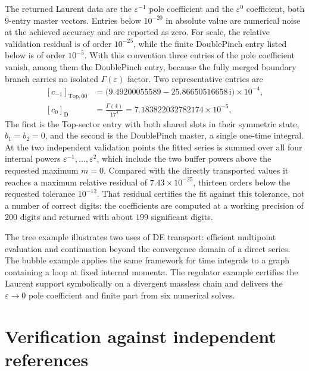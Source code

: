 \documentclass[11pt,a4paper]{article}
\numberwithin{table}{section}
\newcommand{\ii}{\mathrm i}
\begin{document}
The returned Laurent data are the $\varepsilon^{-1}$ pole coefficient and the
$\varepsilon^0$ coefficient, both $9$-entry master vectors. Entries below $10^{-20}$ in
absolute value are numerical noise at the achieved accuracy and are reported as zero. For scale,
the relative validation residual is of order $10^{-25}$, while the finite DoublePinch entry
listed below is of order $10^{-5}$. With this convention three entries of the pole coefficient vanish,
among them the DoublePinch entry, because the fully merged boundary branch carries no
isolated $\Gamma(\varepsilon)$ factor. Two representative entries are
\begin{equation}
  \begin{aligned}
  [c_{-1}]_{\mathrm{Top},00}&=\bigl(9.49200055589-25.86650516658\,\ii\bigr)\times10^{-4},\\
  [c_0]_{\mathrm{D}}&=\frac{\Gamma(4)}{17^4}=7.183822032782174\times10^{-5},
  \end{aligned}
  \label{eq:ep-finite-entries}
\end{equation}
The first is the Top-sector entry with both shared slots in their symmetric state, $b_1=b_2=0$,
and the second is the DoublePinch master, a single one-time integral. At the two independent
validation points the fitted series is summed over all four internal powers
$\varepsilon^{-1},\ldots,\varepsilon^{2}$, which include the two buffer powers above the requested
maximum $m=0$. Compared with the directly transported values it reaches a maximum relative residual
of $7.43\times10^{-25}$, thirteen orders below the requested tolerance $10^{-12}$. That residual
certifies the fit against this tolerance, not a number of correct digits: the coefficients are computed
at a working precision of $200$ digits and returned with about $199$ significant digits.

The tree example illustrates two uses of DE transport: efficient multipoint
evaluation and continuation beyond the convergence domain of a direct series.
The bubble example applies the same framework for time integrals to a graph
containing a loop at fixed internal momenta.
The regulator example certifies the Laurent support symbolically on a divergent
massless chain and delivers the $\varepsilon\to0$ pole coefficient and finite part from six
numerical solves.





\section{Verification against independent references}
\label{sec:verification}
\end{document}
